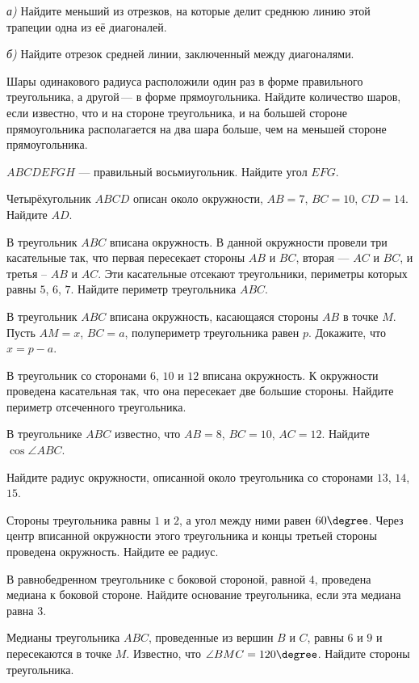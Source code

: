 \begin{class}[number=5]
\begin{listofex}
		\textit{а)} Найдите меньший из отрезков, на которые делит среднюю линию этой трапеции одна из её диагоналей.
		
		\textit{б)} Найдите отрезок средней линии, заключенный между диагоналями.
		\item Шары одинакового радиуса расположили один раз в форме правильного треугольника, а другой --- в форме прямоугольника. Найдите количество шаров, если известно, что и на стороне треугольника, и на большей стороне прямоугольника располагается на два шара больше, чем на меньшей стороне прямоугольника.
	\end{listofex}
\end{class}

%
%
\begin{class}[number=6]
	\begin{listofex}
		\item \( ABCDEFGH \) --- правильный восьмиугольник. Найдите угол \( EFG \).
		\item Четырёхугольник \( ABCD \) описан около окружности, \( AB=7 \), \( BC=10 \), \( CD=14 \). Найдите \( AD \).
		\item В треугольник \( ABC \) вписана окружность. В данной окружности провели три касательные так, что первая пересекает стороны \( AB \) и \( BC \), вторая --- \( AC \) и \( BC \), и третья -- \( AB \) и \( AC \). Эти касательные отсекают треугольники, периметры которых равны \( 5 \), \( 6 \), \( 7 \). Найдите периметр треугольника \( ABC \).
		\item В треугольник \( ABC \) вписана окружность, касающаяся стороны \( AB \) в точке \( M \). Пусть \( AM = x \), \( BC = a \), полупериметр треугольника равен \( p \). Докажите, что \( x = p - a \).
		\item В треугольник со сторонами \( 6 \), \( 10 \) и \( 12 \) вписана окружность. К окружности проведена касательная так, что
		она пересекает две б\textit{о}льшие стороны. Найдите периметр отсеченного треугольника.
		\item В треугольнике \( ABC \) известно, что \( AB=8 \), \( BC=10 \), \( AC=12 \). Найдите \( \cos \angle ABC \).
		\item Найдите радиус окружности, описанной около треугольника со сторонами \( 13 \), \( 14 \), \( 15 \).
		\item Стороны треугольника равны \( 1 \) и \( 2 \), а угол между
		ними равен \( 60\degree \). Через центр вписанной окружности этого треугольника и концы третьей стороны проведена окружность.
		Найдите ее радиус.
		\item В равнобедренном треугольнике с боковой стороной,
		равной \( 4 \), проведена медиана к боковой стороне. Найдите основание треугольника, если эта медиана равна \( 3 \).
		\item Медианы треугольника \( ABC \), проведенные из вершин \( B \) и \( C \), равны \( 6 \) и \( 9 \) и пересекаются в точке \( M \). Известно,
		что \( \angle BMC = 120\degree \). Найдите стороны треугольника.
	\end{listofex}
\end{class}

